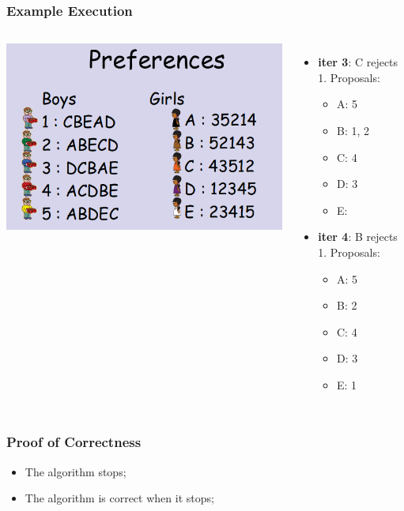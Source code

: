 \documentclass{beamer}
\begin{document}
\begin{frame}
  \frametitle{Example Execution}

  \begin{columns}
    \includegraphics[width=1\textwidth]{../img/marriage2}
    {\large
      \begin{itemize}
      \item {\bf iter 3}: C rejects 1. Proposals:
        \begin{itemize}
        \item A: 5
        \item B: 1, 2
        \item C: 4
        \item D: 3
        \item E:
        \end{itemize}

      \item {\bf iter 4}: B rejects 1. Proposals:
        \begin{itemize}
        \item A: 5
        \item B: 2
        \item C: 4
        \item D: 3
        \item E: 1
        \end{itemize}
      \end{itemize}
    }
  \end{columns}
\end{frame}

\begin{frame}
  \frametitle{Proof of Correctness}

  {\larger
    \begin{itemize}
    \item The algorithm stops;
      
      \bigskip

    \item The algorithm is correct when it stops;
    \end{itemize}
  }
\end{frame}
\end{document}
